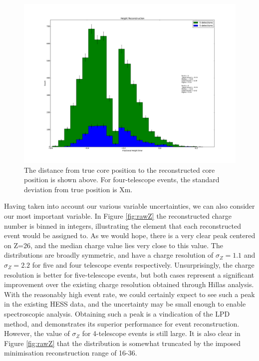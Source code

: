\documentclass[11pt]{article}
\begin{document}
\begin{figure}
\begin{center}
\includegraphics[width=\textwidth]{rawheight}
\caption{The distance from true core position to the reconstructed core position is shown above. For four-telescope events, the standard deviation from true position is Xm.}
\label{fig:rawheight}
\end{center}
\end{figure}

Having taken into account our various variable uncertainties, we can also consider our most important variable. In Figure \ref{fig:rawZ} the reconstructed charge number is binned in integers, illustrating the element that each reconstructed event would be assigned to. As we would hope, there is a very clear peak centered on Z=26, and the median charge value lies very close to this value. The distributions are broadly symmetric, and have a charge resolution of $\sigma_{Z} = 1.1$ and $\sigma_{Z} = 2.2$ for five and four telescope events respectively. Unsurprisingly, the charge resolution is better for five-telescope events, but both cases represent a significant improvement over the existing charge resolution obtained through Hillas analysis. With the reasonably high event rate, we could certainly expect to see such a peak in the existing HESS data, and the uncertainty may be small enough to enable spectroscopic analysis. Obtaining such a peak is a vindication of the LPD method, and demonstrates its superior performance for event reconstruction. However, the value of $\sigma_{Z}$ for 4-telescope events is still large. It is also clear in Figure \ref{fig:rawZ} that the distribution is somewhat truncated by the imposed minimisation reconstruction range of 16-36. 
\end{document}
